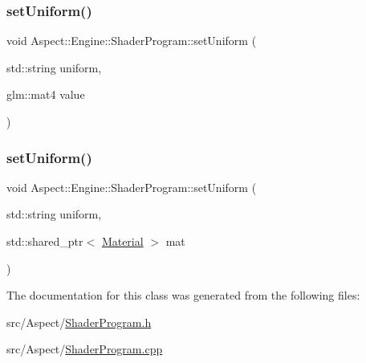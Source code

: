 \subsubsection{\texorpdfstring{set\+Uniform()}{setUniform()}\hspace{0.1cm}{\footnotesize\ttfamily [3/4]}}
{\footnotesize\ttfamily void Aspect\+::\+Engine\+::\+Shader\+Program\+::set\+Uniform (\begin{DoxyParamCaption}\item[{std\+::string}]{uniform,  }\item[{glm\+::mat4}]{value }\end{DoxyParamCaption})}

\mbox{\label{class_aspect_1_1_engine_1_1_shader_program_abfaf605b8dfade33b086b2f33e07762b}} 
\subsubsection{\texorpdfstring{set\+Uniform()}{setUniform()}\hspace{0.1cm}{\footnotesize\ttfamily [4/4]}}
{\footnotesize\ttfamily void Aspect\+::\+Engine\+::\+Shader\+Program\+::set\+Uniform (\begin{DoxyParamCaption}\item[{std\+::string}]{uniform,  }\item[{std\+::shared\+\_\+ptr$<$ \mbox{\hyperlink{class_aspect_1_1_engine_1_1_material}{Material}} $>$}]{mat }\end{DoxyParamCaption})}



The documentation for this class was generated from the following files\+:\begin{DoxyCompactItemize}
\item 
src/\+Aspect/\mbox{\hyperlink{_shader_program_8h}{Shader\+Program.\+h}}\item 
src/\+Aspect/\mbox{\hyperlink{_shader_program_8cpp}{Shader\+Program.\+cpp}}\end{DoxyCompactItemize}
